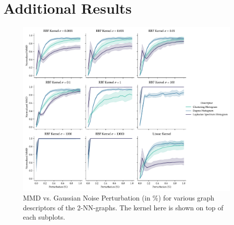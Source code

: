 \chapter{Additional Results}
\begin{figure}[h]
  \centering
  \includegraphics[width=\textwidth]{./figures/results/res_1_5.pdf}
  \caption{MMD vs. Gaussian Noise Perturbation (in \%) for various graph descriptors of the
    2-NN-graphs. The kernel here is shown on top of each subplots.}
  \label{fig:mmd_effect_kernel_knn}
\end{figure}
